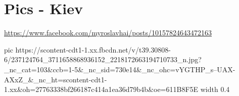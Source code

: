  
 
 
 
 
\section{Pics - Kiev}
\label{sec:pics.kiev}

\url{https://www.facebook.com/myroslavhai/posts/10157824643472163}

\ifcmt
  pic https://scontent-cdt1-1.xx.fbcdn.net/v/t39.30808-6/237124764_3711658868936152_2218172663194710733_n.jpg?_nc_cat=103&ccb=1-5&_nc_sid=730e14&_nc_ohc=vYGTHP_s--UAX-AXxZ_&_nc_ht=scontent-cdt1-1.xx&oh=27763338bf266187c414a1ea36d79b4b&oe=611B8F5E
  width 0.4
\fi
